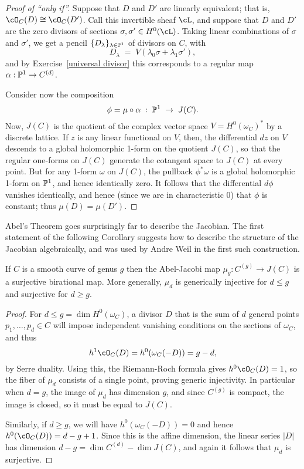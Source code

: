 \begin{proof}[Proof of ``only if'']
Suppose that $D$ and $D'$ are linearly equivalent; that is, $\cO_C(D) \cong \cO_C(D')$. Call this invertible sheaf $\cL$, and suppose that $D$ and $D'$ are the zero divisors of sections $\sigma, \sigma' \in H^0(\cL)$.
Taking linear combinations of $\sigma$ and $\sigma'$, we get a pencil $\{D_\lambda\}_{\lambda \in \PP^1}$ of divisors on $C$, with
$$
D_\lambda \; = \; V(\lambda_0\sigma + \lambda_1\sigma'),
$$
and by Exercise~\ref{universal divisor} this corresponds to a regular map $\alpha : \PP^1 \to C^{(d)}$. 

Consider now the composition
$$
\phi = \mu \circ \alpha \; : \; \PP^1 \; \to \; J(C).
$$
Now, $J(C)$ is the quotient of the complex vector space $V = H^0(\omega_C)^*$ by a discrete lattice. If $z$ is any linear functional on $V$, then, the differential $dz$  on $V$ descends to a global holomorphic 1-form on the quotient $J(C)$, so that the regular one-forms on $J(C)$ generate the cotangent space to $J(C)$ at every point. But for any 1-form $\omega$ on $J(C)$, the pullback $\phi^*\omega$ is a global holomorphic 1-form on $\PP^1$, and hence identically zero. It follows that the differential $d\phi$ vanishes identically, and hence (since we are in characteristic 0) that $\phi$ is constant; thus $\mu(D) = \mu(D')$.
\end{proof}

Abel's Theorem goes surprisingly far to describe the Jacobian. The first statement of the following Corollary suggests how to describe the structure of the Jacobian algebraically, and was used by Andre Weil in the first such construction.

\begin{corollary}
If $C$ is a smooth curve of genus $g$ then the Abel-Jacobi map $\mu_{g}: C^{(g)} \to J(C)$ is a surjective birational map.
More generally, $\mu_{d}$ is generically injective for $d\leq g$ and surjective for $d\geq g$.
\end{corollary}

\begin{proof}
For $d\leq g = \dim H^{0}(\omega_{C})$,  a divisor $D$ that is the sum of $d$ general points $p_{1}, \dots,  p_{d} \in C$ will impose independent vanishing conditions on the sections of $\omega_{C}$, and thus
$$
h^{1}\cO_{C}(D) = h^0(\omega_C(-D)) = g-d,
$$
by Serre duality. Using this, the Riemann-Roch formula gives $h^{0}\cO_{C}(D) = 1$, so the fiber of 
$\mu_{d}$ consists of a single point, proving generic injectivity. In particular when $d= g$, the image of $\mu_{d}$ has
dimension $g$, and since $C^{(g)}$ is compact, the image is closed, so it must be equal to $J(C)$.

Similarly, if $d \geq g$, we will have $h^0(\omega_C(-D)) = 0$ and hence $h^0(\cO_C(D)) = d-g+1$. Since this is the affine
dimension, the linear series $|D|$ has dimension $d-g = \dim C^{(d)} - \dim J(C)$, and again it follows that
$\mu_{d}$ is surjective.
\end{proof}

